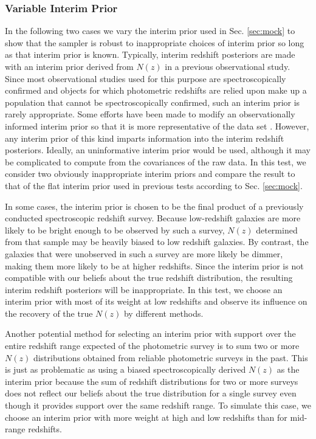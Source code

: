 \documentclass[preprint]{aastex}
\begin{document}
\subsubsection{Variable Interim Prior}
\label{sec:interim}

In the following two cases we vary the interim prior used in Sec. 
\ref{sec:mock} to show that the sampler is robust to inappropriate choices of 
interim prior so long as that interim prior is known.  Typically, interim 
redshift posteriors are made with an interim prior derived from $N(z)$ in a 
previous observational study.  Since most observational studies used for this 
purpose are spectroscopically confirmed and objects for which photometric 
redshifts are relied upon make up a population that cannot be spectroscopically 
confirmed, such an interim prior is rarely appropriate.  Some efforts have been 
made to modify an observationally informed interim prior so that it is more 
representative of the data set \citep{Sheldon2012}.  However, any interim prior 
of this kind imparts information into the interim redshift posteriors.  
Ideally, an uninformative interim prior would be used, although it may be 
complicated to compute from the covariances of the raw data.  In this test, we 
consider two obviously inappropriate interim priors and compare the result to 
that of the flat interim prior used in previous tests according to Sec. 
\ref{sec:mock}.

In some cases, the interim prior is chosen to be the final product of a 
previously conducted spectroscopic redshift survey.  Because low-redshift 
galaxies are more likely to be bright enough to be observed by such a survey, 
$N(z)$ determined from that sample may be heavily biased to low redshift 
galaxies.  By contrast, the galaxies that were unobserved in such a survey are 
more likely be dimmer, making them more likely to be at higher redshifts.  
Since the interim prior is not compatible with our beliefs about the true 
redshift distribution, the resulting interim redshift posteriors will be 
inappropriate.  In this test, we choose an interim prior with most of its 
weight at low redshifts and observe its influence on the recovery of the true 
$N(z)$ by different methods.  

Another potential method for selecting an interim prior with support over the 
entire redshift range expected of the photometric survey is to sum two or more 
$N(z)$ distributions obtained from reliable photometric surveys in the past.  
This is just as problematic as using a biased spectroscopically derived $N(z)$ 
as the interim prior because the sum of redshift distributions for two or more 
surveys does not reflect our beliefs about the true distribution for a single 
survey even though it provides support over the same redshift range.  To 
simulate this case, we choose an interim prior with more weight at high and low 
redshifts than for mid-range redshifts.  
\end{document}
